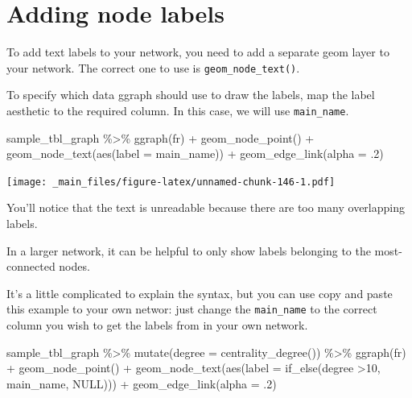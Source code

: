 \documentclass[
]{book}
\newenvironment{Shaded}{\begin{snugshade}}{\end{snugshade}}
\newcommand{\AttributeTok}[1]{\textcolor[rgb]{0.77,0.63,0.00}{#1}}
\newcommand{\ConstantTok}[1]{\textcolor[rgb]{0.00,0.00,0.00}{#1}}
\newcommand{\DecValTok}[1]{\textcolor[rgb]{0.00,0.00,0.81}{#1}}
\newcommand{\FunctionTok}[1]{\textcolor[rgb]{0.00,0.00,0.00}{#1}}
\newcommand{\NormalTok}[1]{#1}
\newcommand{\SpecialCharTok}[1]{\textcolor[rgb]{0.00,0.00,0.00}{#1}}
\newcommand{\StringTok}[1]{\textcolor[rgb]{0.31,0.60,0.02}{#1}}
\begin{document}
\hypertarget{adding-node-labels}{%
\section{Adding node labels}\label{adding-node-labels}}

To add text labels to your network, you need to add a separate geom layer to your network. The correct one to use is \texttt{geom\_node\_text()}.

To specify which data ggraph should use to draw the labels, map the label aesthetic to the required column. In this case, we will use \texttt{main\_name}.

\begin{Shaded}
\begin{Highlighting}[]
\NormalTok{sample\_tbl\_graph }\SpecialCharTok{\%\textgreater{}\%} 
  \FunctionTok{ggraph}\NormalTok{(}\StringTok{\textquotesingle{}fr\textquotesingle{}}\NormalTok{) }\SpecialCharTok{+} 
  \FunctionTok{geom\_node\_point}\NormalTok{() }\SpecialCharTok{+} 
  \FunctionTok{geom\_node\_text}\NormalTok{(}\FunctionTok{aes}\NormalTok{(}\AttributeTok{label =}\NormalTok{ main\_name)) }\SpecialCharTok{+} 
  \FunctionTok{geom\_edge\_link}\NormalTok{(}\AttributeTok{alpha =}\NormalTok{ .}\DecValTok{2}\NormalTok{)}
\end{Highlighting}
\end{Shaded}

\texttt{[image: \_main\_files/figure-latex/unnamed-chunk-146-1.pdf]}

You'll notice that the text is unreadable because there are too many overlapping labels.

In a larger network, it can be helpful to only show labels belonging to the most-connected nodes.

It's a little complicated to explain the syntax, but you can use copy and paste this example to your own networ: just change the \texttt{main\_name} to the correct column you wish to get the labels from in your own network.

\begin{Shaded}
\begin{Highlighting}[]
\NormalTok{sample\_tbl\_graph }\SpecialCharTok{\%\textgreater{}\%} 
  \FunctionTok{mutate}\NormalTok{(}\AttributeTok{degree =} \FunctionTok{centrality\_degree}\NormalTok{()) }\SpecialCharTok{\%\textgreater{}\%} 
  \FunctionTok{ggraph}\NormalTok{(}\StringTok{\textquotesingle{}fr\textquotesingle{}}\NormalTok{) }\SpecialCharTok{+} 
  \FunctionTok{geom\_node\_point}\NormalTok{() }\SpecialCharTok{+} 
  \FunctionTok{geom\_node\_text}\NormalTok{(}\FunctionTok{aes}\NormalTok{(}\AttributeTok{label =} \FunctionTok{if\_else}\NormalTok{(degree }\SpecialCharTok{\textgreater{}}\DecValTok{10}\NormalTok{, main\_name, }\ConstantTok{NULL}\NormalTok{))) }\SpecialCharTok{+} 
  \FunctionTok{geom\_edge\_link}\NormalTok{(}\AttributeTok{alpha =}\NormalTok{ .}\DecValTok{2}\NormalTok{)}
\end{Highlighting}
\end{Shaded}
\end{document}
